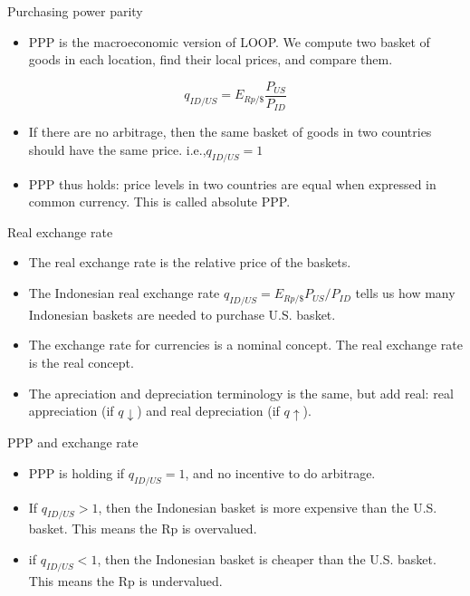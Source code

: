 \documentclass[
  ignorenonframetext,
]{beamer}
\providecommand{\tightlist}{%
  \setlength{\itemsep}{0pt}\setlength{\parskip}{0pt}}\usepackage{longtable,booktabs,array}
\begin{document}
\begin{frame}{Purchasing power parity}
\label{purchasing-power-parity-1}
\begin{itemize}
\tightlist
\item
  PPP is the macroeconomic version of LOOP. We compute two basket of
  goods in each location, find their local prices, and compare them.
\end{itemize}

\[
q_{ID/US}=E_{Rp/\$}\frac{P_{US}}{P_{ID}}
\]

\begin{itemize}
\item
  If there are no arbitrage, then the same basket of goods in two
  countries should have the same price. i.e.,\(q_{ID/US}=1\)
\item
  PPP thus holds: price levels in two countries are equal when expressed
  in common currency. This is called absolute PPP.
\end{itemize}
\end{frame}

\begin{frame}{Real exchange rate}
\label{real-exchange-rate}
\begin{itemize}
\item
  The real exchange rate is the relative price of the baskets.
\item
  The Indonesian real exchange rate \(q_{ID/US}=E_{Rp/\$}P_{US}/P_{ID}\)
  tells us how many Indonesian baskets are needed to purchase U.S.
  basket.
\item
  The exchange rate for currencies is a nominal concept. The real
  exchange rate is the real concept.
\item
  The apreciation and depreciation terminology is the same, but add
  real: real appreciation (if \(q \downarrow\)) and real depreciation
  (if \(q \uparrow\)).
\end{itemize}
\end{frame}

\begin{frame}{PPP and exchange rate}
\label{ppp-and-exchange-rate}
\begin{itemize}
\item
  PPP is holding if \(q_{ID/US}=1\), and no incentive to do arbitrage.
\item
  If \(q_{ID/US}>1\), then the Indonesian basket is more expensive than
  the U.S. basket. This means the Rp is overvalued.
\item
  if \(q_{ID/US}<1\), then the Indonesian basket is cheaper than the
  U.S. basket. This means the Rp is undervalued.
\end{itemize}
\end{frame}
\end{document}
